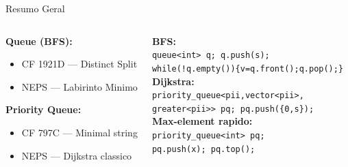 \documentclass[aspectratio=169,10pt]{beamer}
\begin{document}
\begin{frame}[shrink=2]{Resumo Geral}
\begin{columns}[t]
\begin{tcolorbox}[caixaVerde,title={Problemas para Praticar}]
        \textbf{Queue (BFS):}
        \begin{itemize}
          \item CF 1921D --- Distinct Split
          \item NEPS --- Labirinto Minimo
        \end{itemize}
        \textbf{Priority Queue:}
        \begin{itemize}
          \item CF 797C --- Minimal string
          \item NEPS --- Dijkstra classico
        \end{itemize}
      \end{tcolorbox}
      \begin{tcolorbox}[caixaAzul,title={Templates Mentais}]
        \footnotesize
        \textbf{BFS:}\\
        \texttt{queue<int> q; q.push(s);}\\
        \texttt{while(!q.empty())\{v=q.front();q.pop();\}}\\[4pt]
        \textbf{Dijkstra:}\\
        \texttt{priority\_queue<pii,vector<pii>,}\\
        \texttt{greater<pii>> pq; pq.push(\{0,s\});}\\[4pt]
        \textbf{Max-element rapido:}\\
        \texttt{priority\_queue<int> pq;}\\
        \texttt{pq.push(x); pq.top();}
      \end{tcolorbox}
  \end{columns}
\end{frame}
\end{document}
